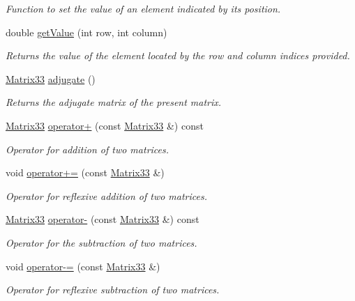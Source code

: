 \begin{DoxyCompactItemize}
\begin{DoxyCompactList}\small\item\em \-Function to set the value of an element indicated by its position. \end{DoxyCompactList}\item 
double \hyperlink{classMatrix33_a849bbdf7b456ddacf7185b087fca4015}{get\-Value} (int row, int column)
\begin{DoxyCompactList}\small\item\em \-Returns the value of the element located by the row and column indices provided. \end{DoxyCompactList}\item 
\hyperlink{classMatrix33}{\-Matrix33} \hyperlink{classMatrix33_a4e64ab5af4921c24b8270a0c9050f4ba}{adjugate} ()
\begin{DoxyCompactList}\small\item\em \-Returns the adjugate matrix of the present matrix. \end{DoxyCompactList}\item 
\hyperlink{classMatrix33}{\-Matrix33} \hyperlink{classMatrix33_adc58ec5739c9250ff1150c725d0e868e}{operator+} (const \hyperlink{classMatrix33}{\-Matrix33} \&) const 
\begin{DoxyCompactList}\small\item\em \-Operator for addition of two matrices. \end{DoxyCompactList}\item 
void \hyperlink{classMatrix33_acb59e59d3937e075521f478ba83b7165}{operator+=} (const \hyperlink{classMatrix33}{\-Matrix33} \&)
\begin{DoxyCompactList}\small\item\em \-Operator for reflexive addition of two matrices. \end{DoxyCompactList}\item 
\hyperlink{classMatrix33}{\-Matrix33} \hyperlink{classMatrix33_a372f71ec208bb6d3045acd4324b7cb06}{operator-\/} (const \hyperlink{classMatrix33}{\-Matrix33} \&) const 
\begin{DoxyCompactList}\small\item\em \-Operator for the subtraction of two matrices. \end{DoxyCompactList}\item 
void \hyperlink{classMatrix33_abc889e10a9c7c532195c7031c1344a74}{operator-\/=} (const \hyperlink{classMatrix33}{\-Matrix33} \&)
\begin{DoxyCompactList}\small\item\em \-Operator for reflexive subtraction of two matrices. \end{DoxyCompactList}\item 

\end{DoxyCompactItemize}
